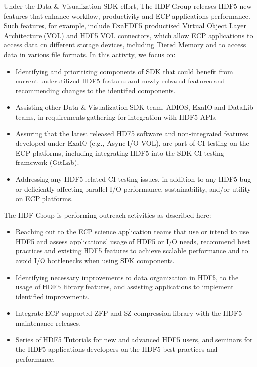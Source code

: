 Under the Data \& Visualization SDK effort, The HDF Group releases HDF5 new features that enhance workflow, productivity and ECP applications performance. Such features, for example, include ExaHDF5 productized Virtual Object Layer Architecture (VOL) and HDF5 VOL connectors, which allow ECP applications to access data on different storage devices, including Tiered Memory and to access data in various file formats. 
In this activity, we focus on:
\begin{itemize}
    \item Identifying and prioritizing components of SDK that could benefit from current underutilized HDF5 features and newly released features and recommending changes to the identified components.
    \item Assisting other Data \& Visualization SDK team, ADIOS, ExaIO and DataLib teams, in requirements gathering for integration with HDF5 APIs.
    \item Assuring that the latest released HDF5 software and non-integrated features developed under ExaIO (e.g., Async I/O VOL), are part of CI testing on the ECP platforms, including integrating HDF5 into the SDK CI testing framework (GitLab).
    \item Addressing any HDF5 related CI testing issues, in addition to any HDF5 bug or deficiently affecting parallel I/O performance, sustainability, and/or utility on ECP platforms. 
\end{itemize}
The HDF Group is performing outreach activities as described here:
\begin{itemize}
    \item Reaching out to the ECP science application teams that use or intend to use HDF5 and assess applications’ usage of HDF5 or I/O needs, recommend best practices and existing HDF5 features to achieve scalable performance and to avoid I/O bottlenecks when using SDK components.
    \item Identifying necessary improvements to data organization in HDF5, to the usage of HDF5 library features, and assisting applications to implement identified improvements.
    \item Integrate ECP supported ZFP and SZ compression library with the HDF5 maintenance releases.
    \item Series of HDF5 Tutorials for new and advanced HDF5 users, and seminars for the HDF5 applications developers on the HDF5 best practices and performance.
\end{itemize}

